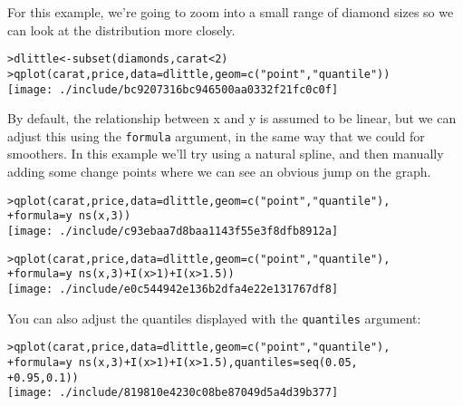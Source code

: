 For this example, we're going to zoom into a small range of diamond sizes so we can look at the distribution more closely.

\begin{alltt}
> dlittle <- subset(diamonds, carat < 2)
> qplot(carat, price, data = dlittle, geom = c("point", "quantile"))
\texttt{[image: ./include/bc9207316bc946500aa0332f21fc0c0f]}

\end{alltt}

By default, the relationship between x and y is assumed to be linear, but we can adjust this using the {\tt formula} argument, in the same way that we could for smoothers.  In this example we'll try using a natural spline, and then manually adding some change points where we can see an obvious jump on the graph.

\begin{alltt}
> qplot(carat, price, data = dlittle, geom = c("point", "quantile"), 
+     formula = y ~ ns(x, 3))
\texttt{[image: ./include/c93ebaa7d8baa1143f55e3f8dfb8912a]}

> qplot(carat, price, data = dlittle, geom = c("point", "quantile"), 
+     formula = y ~ ns(x, 3) + I(x > 1) + I(x > 1.5))
\texttt{[image: ./include/e0c544942e136b2dfa4e22e131767df8]}

\end{alltt}

You can also adjust the quantiles displayed with the {\tt quantiles} argument:

\begin{alltt}
> qplot(carat, price, data = dlittle, geom = c("point", "quantile"), 
+     formula = y ~ ns(x, 3) + I(x > 1) + I(x > 1.5), quantiles = seq(0.05, 
+         0.95, 0.1))
\texttt{[image: ./include/819810e4230c08be87049d5a4d39b377]}

\end{alltt}

